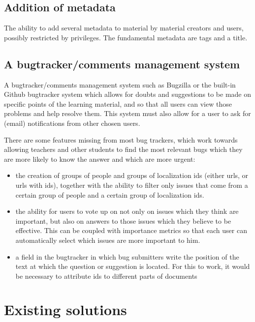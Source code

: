 \documentclass[12pt]{article}
\begin{document}
\subsection{Addition of metadata}

The ability to add several metadata to material by material creators and users, possibly restricted by privileges. The fundamental metadata are tags and a title.
  
\subsection{A bugtracker/comments management system}

A bugtracker/comments management system such as Bugzilla or the built-in Github bugtracker system which allows for doubts and suggestions to be made on specific points of the learning material, and so that all users can view those problems and help resolve them. This system must also allow for a user to ask for (email) notifications from other chosen users.
  
There are some features missing from most bug trackers, which work towards allowing teachers and other students to find the most relevant bugs which they are more likely to know the answer and which are more urgent:
  
\begin{itemize}
  \item the creation of groups of people and groups of localization ids (either urls, or urls with ids), together with the ability to filter only issues that come from a certain group of people and a certain group of localization ids.
  \item the ability for users to vote up on not only on issues which they think are important, but also on answers to those issues which they believe to be effective. This can be coupled with importance metrics so that each user can automatically select which issues are more important to him.
  \item a field in the bugtracker in which bug submitters write the position of the text at which the question or suggestion is located. For this to work, it would be necessary to attribute ids to different parts of documents
\end{itemize}

\section{Existing solutions} \label{existing-solutions}
\end{document}
